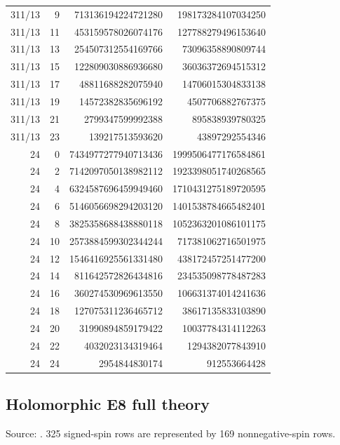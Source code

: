 \begin{longtable}{@{}rrrr@{}}
311/13 & 9 & 713136194224721280 & 198173284107034250\\
311/13 & 11 & 453159578026074176 & 127788279496153640\\
311/13 & 13 & 254507312554169766 & 73096358890809744\\
311/13 & 15 & 122809030886936680 & 36036372694515312\\
311/13 & 17 & 48811688282075940 & 14706015304833138\\
311/13 & 19 & 14572382835696192 & 4507706882767375\\
311/13 & 21 & 2799347599992388 & 895838939780325\\
311/13 & 23 & 139217513593620 & 43897292554346\\
24 & 0 & 7434977277940713436 & 1999506477176584861\\
24 & 2 & 7142097050138982112 & 1923398051740268565\\
24 & 4 & 6324587696459949460 & 1710431275189720595\\
24 & 6 & 5146056698294203120 & 1401538784665482401\\
24 & 8 & 3825358688438880118 & 1052363201086101175\\
24 & 10 & 2573884599302344244 & 717381062716501975\\
24 & 12 & 1546416925561331480 & 438172457251477200\\
24 & 14 & 811642572826434816 & 234535098778487283\\
24 & 16 & 360274530969613550 & 106631374014241636\\
24 & 18 & 127075311236465712 & 38617135833103890\\
24 & 20 & 31990894859179422 & 10037784314112263\\
24 & 22 & 4032023134319464 & 1294382077843910\\
24 & 24 & 2954844830174 & 912553664428\\
\end{longtable}
\endgroup
\subsection{Holomorphic E8 full theory}
Source: . 325 signed-spin rows are represented by 169 nonnegative-spin rows.


